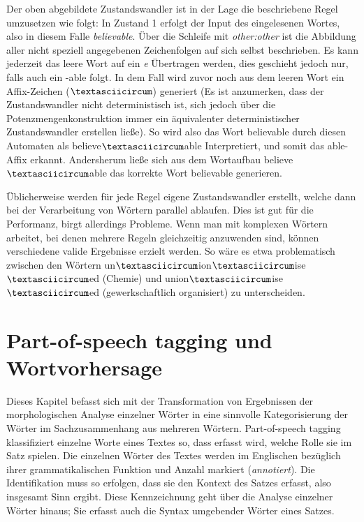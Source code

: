 \documentclass[12pt]{report}
\begin{document}
Der oben abgebildete Zustandswandler ist in der Lage die beschriebene Regel umzusetzen wie folgt: In Zustand 1 erfolgt der Input des eingelesenen Wortes, also in diesem Falle \textit{\glqq  believable\grqq{}}. Über die Schleife mit \textit{\glqq  other:other\grqq{}} ist die Abbildung aller nicht speziell angegebenen Zeichenfolgen auf sich selbst beschrieben. Es kann jederzeit das leere Wort auf ein \textit{\glqq  e\grqq{}} Übertragen werden, dies geschieht jedoch nur, falls auch ein \glqq  -able\grqq{} folgt. In dem Fall wird zuvor noch aus dem leeren Wort ein Affix-Zeichen ($\textasciicircum$) generiert (Es ist anzumerken, dass der Zustandswandler nicht deterministisch ist, sich jedoch über die Potenzmengenkonstruktion immer ein äquivalenter deterministischer Zustandswandler erstellen ließe). So wird also das Wort \glqq  believable\grqq{} durch diesen Automaten als \glqq  believe$\textasciicircum$able\grqq{} Interpretiert, und somit das \glqq  able\grqq{}-Affix erkannt. Andersherum ließe sich aus dem Wortaufbau \glqq  believe$\textasciicircum$able\grqq{} das korrekte Wort \glqq  believable\grqq{} generieren.

Üblicherweise werden für jede Regel eigene Zustandswandler erstellt, welche dann bei der Verarbeitung von Wörtern parallel ablaufen. Dies ist gut für die Performanz, birgt allerdings Probleme. Wenn man mit komplexen Wörtern arbeitet, bei denen mehrere Regeln gleichzeitig anzuwenden sind, können verschiedene valide Ergebnisse erzielt werden. So wäre es etwa problematisch zwischen den Wörtern \glqq  un$\textasciicircum$ion$\textasciicircum$ise$\textasciicircum$ed\grqq{} (Chemie) und \glqq  union$\textasciicircum$ise$\textasciicircum$ed\grqq{} (gewerkschaftlich organisiert) zu unterscheiden. 

\section{Part-of-speech tagging und Wortvorhersage}
Dieses Kapitel befasst sich mit der Transformation von Ergebnissen der morphologischen Analyse einzelner Wörter in eine sinnvolle Kategorisierung der Wörter im Sachzusammenhang aus mehreren Wörtern. Part-of-speech tagging klassifiziert einzelne Worte eines Textes so, dass erfasst wird, welche Rolle sie im Satz spielen. Die einzelnen Wörter des Textes werden im Englischen bezüglich ihrer grammatikalischen Funktion und Anzahl markiert (\textit{annotiert}). Die Identifikation muss so erfolgen, dass sie den Kontext des Satzes erfasst, also insgesamt Sinn ergibt. Diese Kennzeichnung geht über die Analyse einzelner Wörter hinaus; Sie erfasst auch die Syntax umgebender Wörter eines Satzes. 
\end{document}
